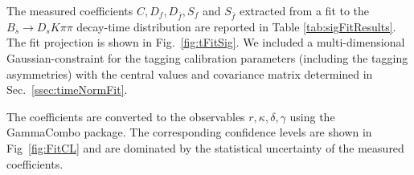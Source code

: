 %
%

The measured \CP coefficients $C,D_{f},D_{\bar{f}},S_{f} $ and $S_{\bar{f}}$ extracted from a 
fit to the $B_s \to D_s K \pi\pi$ decay-time distribution are reported in Table \ref{tab:sigFitResults}.
The fit projection is shown in Fig.~\ref{fig:tFitSig}.
We included a multi-dimensional Gaussian-constraint for the tagging calibration parameters (including the tagging asymmetries) with the central values and covariance matrix determined in Sec.~\ref{ssec:timeNormFit}.

The \CP coefficients are converted to the observables $r,\kappa,\delta,\gamma$ using the GammaCombo package.
The corresponding confidence levels  are shown in Fig~\ref{fig:FitCL} and are dominated by the statistical uncertainty of the measured \CP coefficients.

